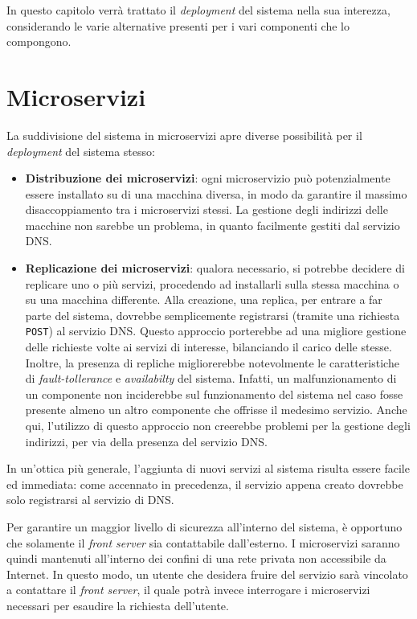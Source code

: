 \documentclass[a4paper,12pt]{report}
\begin{document}
In questo capitolo verrà trattato il \emph{deployment} del sistema nella sua interezza, considerando le varie alternative presenti per i vari componenti che lo compongono.

\section{Microservizi}

La suddivisione del sistema in microservizi apre diverse possibilità per il \emph{deployment} del sistema stesso:
\begin{itemize}
	\item \textbf{Distribuzione dei microservizi}: ogni microservizio può potenzialmente essere installato su di una macchina diversa, in modo da garantire il massimo disaccoppiamento tra i microservizi stessi. La gestione degli indirizzi delle macchine non sarebbe un problema, in quanto facilmente gestiti dal servizio DNS.
	\item \textbf{Replicazione dei microservizi}: qualora necessario, si potrebbe decidere di replicare uno o più servizi, procedendo ad installarli sulla stessa macchina o su una macchina differente. Alla creazione, una replica, per entrare a far parte del sistema, dovrebbe semplicemente registrarsi (tramite una richiesta \texttt{POST}) al servizio DNS. Questo approccio porterebbe ad una migliore gestione delle richieste volte ai servizi di interesse, bilanciando il carico delle stesse. Inoltre, la presenza di repliche migliorerebbe notevolmente le caratteristiche di \emph{fault-tollerance} e \emph{availabilty} del sistema. Infatti, un malfunzionamento di un componente non inciderebbe sul funzionamento del sistema nel caso fosse presente almeno un altro componente che offrisse il medesimo servizio. Anche qui, l'utilizzo di questo approccio non creerebbe problemi per la gestione degli indirizzi, per via della presenza del servizio DNS.
\end{itemize}

In un'ottica più generale, l'aggiunta di nuovi servizi al sistema risulta essere facile ed immediata: come accennato in precedenza, il servizio appena creato dovrebbe solo registrarsi al servizio di DNS.

Per garantire un maggior livello di sicurezza all'interno del sistema, è opportuno che solamente il \emph{front server} sia contattabile dall'esterno. I microservizi saranno quindi mantenuti all'interno dei confini di una rete privata non accessibile da Internet. In questo modo, un utente che desidera fruire del servizio sarà vincolato a contattare il \emph{front server}, il quale potrà invece interrogare i microservizi necessari per esaudire la richiesta dell'utente.
\end{document}

